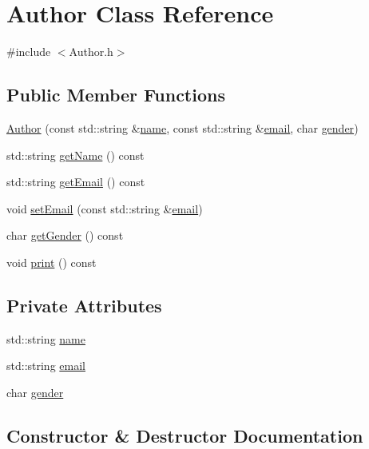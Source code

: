 \hypertarget{classAuthor}{}\section{Author Class Reference}
\label{classAuthor}


{\ttfamily \#include $<$Author.\+h$>$}

\subsection*{Public Member Functions}
\begin{DoxyCompactItemize}
\item 
\hyperlink{classAuthor_a8873fad1ccf89e11a9f499d8a0e2607f}{Author} (const std\+::string \&\hyperlink{classAuthor_a618f8527df84dc680f62a967f6f5e96e}{name}, const std\+::string \&\hyperlink{classAuthor_a8542e2f9c1f481b40665cb3b32f43c8e}{email}, char \hyperlink{classAuthor_a3e7bac289b21d7f97dc2bf14e56b9a14}{gender})
\item 
std\+::string \hyperlink{classAuthor_a2d27943db18f822be1a301bca65fb6ef}{get\+Name} () const 
\item 
std\+::string \hyperlink{classAuthor_af7dd4e055b1a7ea0cf1623c1c0b46d62}{get\+Email} () const 
\item 
void \hyperlink{classAuthor_a3cf04f59de5f1f6cfb50a55667844cfd}{set\+Email} (const std\+::string \&\hyperlink{classAuthor_a8542e2f9c1f481b40665cb3b32f43c8e}{email})
\item 
char \hyperlink{classAuthor_a4ff6cc39d18894b0538e10a8e7170988}{get\+Gender} () const 
\item 
void \hyperlink{classAuthor_a5d5d6296cd6cf5c5017fc2f27a8f6925}{print} () const 
\end{DoxyCompactItemize}
\subsection*{Private Attributes}
\begin{DoxyCompactItemize}
\item 
std\+::string \hyperlink{classAuthor_a618f8527df84dc680f62a967f6f5e96e}{name}
\item 
std\+::string \hyperlink{classAuthor_a8542e2f9c1f481b40665cb3b32f43c8e}{email}
\item 
char \hyperlink{classAuthor_a3e7bac289b21d7f97dc2bf14e56b9a14}{gender}
\end{DoxyCompactItemize}


\subsection{Constructor \& Destructor Documentation}
